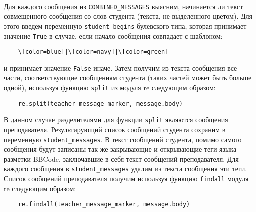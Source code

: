 \documentclass[12pt, a4paper, oneside]{article}
\begin{document}
\paragraph{}
Для каждого сообщения из \texttt{COMBINED\_MESSAGES} выясним, начинается ли текст совмещенного сообщения со слов студента (текста, не выделенного цветом). Для этого введем переменную \texttt{student\_begins} булевского типа, которая принимает значение \texttt{True} в случае, если начало сообщения совпадает с шаблоном:
\begin{verbatim}
    \[color=blue]|\[color=navy]|\[color=green]
\end{verbatim}
и принимает значение \texttt{False} иначе. Затем получим из текста сообщения все части, соответствующие сообщениям студента (таких частей может быть больше одной), используя функцию \texttt{split} из модуля re следующим образом:
\begin{verbatim}
    re.split(teacher_message_marker, message.body)
\end{verbatim}
В данном случае разделителями для функции \texttt{split} являются сообщения преподавателя. Результирующий список сообщений студента сохраним в переменную \texttt{student\_messages}. В текст сообщений студента, помимо самого сообщения будут записаны так же закрывающие и открывающие теги языка разметки BBCode, заключавшие в себя текст сообщений преподавателя. Для каждого сообщения в \texttt{student\_messages} удалим из текста сообщения эти теги. Список сообщений преподавателя получим используя функцию \texttt{findall} модуля re следующим образом:
\begin{verbatim}
    re.findall(teacher_message_marker, message.body)
\end{verbatim}
\end{document}
